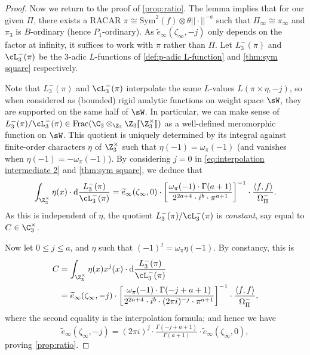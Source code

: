 \documentclass[10pt,reqno,a4paper]{amsart}
\begin{document}
\begin{proof}
Now we return to the proof of \cref{prop:ratio}. The lemma implies that for our given $\Pi$, there exists a RACAR $\pi \cong \mathrm{Sym}^2(f) \otimes \theta||\cdot||^{-a}$ such that $\Pi_\infty \cong \pi_\infty$ and $\pi_3$ is $B$-ordinary (hence $P_1$-ordinary). As $\widetilde{e}_\infty(\zeta_\infty,-j)$ only depends on the factor at infinity, it suffices to work with $\pi$ rather than $\Pi$. Let $L_3^-(\pi)$ and $\cL_3^-(\pi)$ be the $3$-adic $L$-functions of \cref{def:p-adic L-function} and \cref{thm:sym square} respectively.

Note that $L_3^-(\pi)$ and $\cL_3^-(\pi)$ interpolate the same $L$-values $L(\pi\times\eta,-j)$, so when considered as (bounded) rigid analytic functions on weight space $\sW$, they are supported on the same half of $\sW$. In particular, we can make sense of $L_3^-(\pi)/\cL_3^-(\pi) \in \mathrm{Frac}(\C_3\otimes_{\Z_3}\Z_3[\![\Z_3^\times]\!])$ as a well-defined meromorphic function on $\sW$. This quotient is uniquely determined by its integral against finite-order characters $\eta$ of $\Z_3^\times$ such that $\eta(-1) = \omega_\pi(-1)$ (and vanishes when $\eta(-1) = - \omega_\pi(-1)$). By considering $j = 0$ in \eqref{eq:interpolation intermediate 2} and \cref{thm:sym square}, we deduce that
\[
\int_{\Z_3^\times} \eta(x) \cdot \mathrm{d}\frac{L_3^-(\pi)}{\cL_3^-(\pi)} =  \widetilde{e}_\infty(\zeta_\infty,0) \cdot \left[\frac{\omega_\pi(-1)\cdot \Gamma(a+1)}{2^{2a+4}\cdot i^b \cdot \pi^{a+1}}\right]^{-1} \cdot \frac{\langle f,f\rangle}{\Omega_\Pi^-}.
\]
As this is independent of $\eta$, the quotient $L_3^-(\pi)/\cL_3^-(\pi)$ is \emph{constant}, say equal to $C \in \C_3^\times$.

Now let $0 \leq j \leq a$, and $\eta$ such that $(-1)^j = \omega_\pi\eta(-1)$. By constancy, this is
\begin{align*}
C &= \int_{\Z_3^\times} \eta(x)x^{j}(x) \cdot \mathrm{d}\frac{L_3^-(\pi)}{\cL_3^-(\pi)}\\
&= \widetilde{e}_\infty(\zeta_\infty,-j)\cdot\left[ \frac{\omega_\pi(-1)\cdot \Gamma(-j+a+1)}{2^{2a+4}\cdot i^b \cdot (2\pi i)^{-j}\cdot \pi^{a+1}}\right]^{-1}  \cdot \frac{\langle f,f\rangle}{\Omega_\Pi^-},
\end{align*}
where the second equality is the interpolation formula; and hence we have
\begin{equation}\label{eq:ratio}
\widetilde{e}_\infty(\zeta_\infty,-j) = (2\pi i)^{j} \cdot \tfrac{\Gamma(-j+a+1)}{\Gamma(a+1)} \cdot \widetilde{e}_\infty(\zeta_\infty,0),
\end{equation}
proving \cref{prop:ratio}.
\end{proof}
\end{document}
